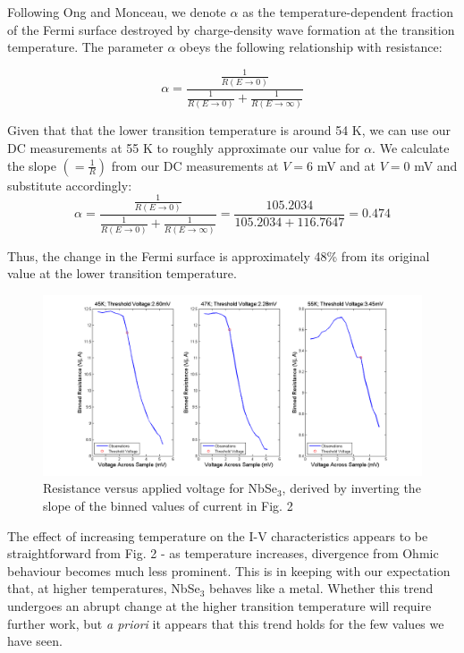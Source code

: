 \documentclass[aps,prl,nofootinbib,twocolumn,superscriptaddress,groupedaddress]{revtex4}  %
\begin{document}
Following Ong and Monceau\cite{ong}, we denote $\alpha$ as the temperature-dependent fraction of the Fermi surface destroyed by charge-density wave formation at the transition temperature. The parameter $\alpha$ obeys the following relationship with resistance\cite{ong}:

\begin{equation}
\alpha = \frac{\frac{1}{R(E \rightarrow 0)}}{\frac{1}{R(E \rightarrow 0)} + \frac{1}{R(E \rightarrow \infty)}} 
\end{equation}

Given that that the lower transition temperature is around 54 K, we can use our DC measurements at 55 K to roughly approximate our value for $\alpha$. We calculate the slope $\left( = \frac{1}{R}\right)$ from our DC measurements at $V = 6$ mV and at $V = 0$ mV and substitute accordingly:
$$
\alpha = \frac{\frac{1}{R(E \rightarrow 0)}}{\frac{1}{R(E \rightarrow 0)} + \frac{1}{R(E \rightarrow \infty)}} = \frac{105.2034}{105.2034 + 116.7647} = 0.474
$$

Thus, the change in the Fermi surface is approximately 48\% from its original value at the lower transition temperature.

\onecolumngrid

\begin{center}
\begin{figure}[b]
\centering
\includegraphics[scale=0.5]{../Analysis/../Analysis/DCResistanceVersusVoltage.png} 
\caption{Resistance versus applied voltage for NbSe$_{3}$, derived by inverting the slope of the binned values of current in Fig. 2}
\end{figure}
\end{center}

\newpage
\twocolumngrid

The effect of increasing temperature on the I-V characteristics appears to be straightforward from Fig. 2 - as temperature increases, divergence from Ohmic behaviour becomes much less prominent. This is in keeping with our expectation that, at higher temperatures, NbSe$_{3}$ behaves like a metal. Whether this trend undergoes an abrupt change at the higher transition temperature will require further work, but \textit{a priori} it appears that this trend holds for the few values we have seen.
\end{document}
